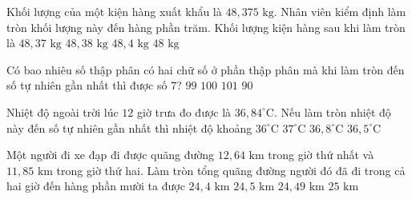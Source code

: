 \begin{ex} %
Khối lượng của một kiện hàng xuất khẩu là $48{,}375\text{ kg}$. Nhân viên kiểm định làm tròn khối lượng này đến hàng phần trăm. Khối lượng kiện hàng sau khi làm tròn là
\choice
{$48{,}37\text{ kg}$}
{\True $48{,}38\text{ kg}$}
{$48{,}4\text{ kg}$}
{$48\text{ kg}$}
\end{ex}

\begin{ex} %
Có bao nhiêu số thập phân có hai chữ số ở phần thập phân mà khi làm tròn đến số tự nhiên gần nhất thì được số $7$?
\choice
{$99$}
{\True $100$}
{$101$}
{$90$}
\end{ex}

\begin{ex} %
Nhiệt độ ngoài trời lúc $12$ giờ trưa đo được là $36{,}84^\circ\text{C}$. Nếu làm tròn nhiệt độ này đến số tự nhiên gần nhất thì nhiệt độ khoảng
\choice
{$36^\circ\text{C}$}
{\True $37^\circ\text{C}$}
{$36{,}8^\circ\text{C}$}
{$36{,}5^\circ\text{C}$}
\end{ex}

\begin{ex} %
Một người đi xe đạp đi được quãng đường $12{,}64\text{ km}$ trong giờ thứ nhất và $11{,}85\text{ km}$ trong giờ thứ hai. Làm tròn tổng quãng đường người đó đã đi trong cả hai giờ đến hàng phần mười ta được
\choice
{$24{,}4\text{ km}$}
{\True $24{,}5\text{ km}$}
{$24{,}49\text{ km}$}
{$25\text{ km}$}
\end{ex}

